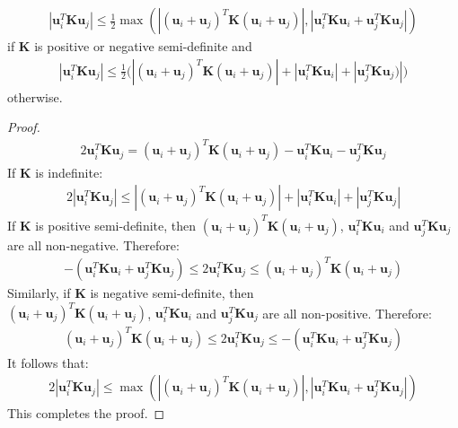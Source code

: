 \begin{lemma}
  \begin{align}
    |\bm{u}_i^T \bm{K} \bm{u}_j| \leq \frac{1}{2} \max(|(\bm{u}_i + \bm{u}_j)^T \bm{K} (\bm{u}_i + \bm{u}_j)|, |\bm{u}_i^T \bm{K} \bm{u}_i + \bm{u}_j^T \bm{K} \bm{u}_j|)
  \end{align}
  if $\bm{K}$ is positive or negative semi-definite and
  \begin{align}
    |\bm{u}_i^T \bm{K} \bm{u}_j| \leq \frac{1}{2} \Big( |(\bm{u}_i + \bm{u}_j)^T \bm{K} (\bm{u}_i + \bm{u}_j)| + |\bm{u}_i^T \bm{K} \bm{u}_i| + |\bm{u}_j^T \bm{K} \bm{u}_j)| \Big)
  \end{align}
  otherwise.
  \label{lemma:bound1}
\end{lemma}
\begin{proof}
  \begin{align}
    2 \bm{u}_i^T \bm{K} \bm{u}_j = (\bm{u}_i + \bm{u}_j)^T \bm{K} (\bm{u}_i + \bm{u}_j) - \bm{u}_i^T \bm{K} \bm{u}_i - \bm{u}_j^T \bm{K} \bm{u}_j
  \end{align}
  If $\bm{K}$ is indefinite:
  \begin{align}
    2 |\bm{u}_i^T \bm{K} \bm{u}_j| \leq |(\bm{u}_i + \bm{u}_j)^T \bm{K} (\bm{u}_i + \bm{u}_j)| + |\bm{u}_i^T \bm{K} \bm{u}_i| + |\bm{u}_j^T \bm{K} \bm{u}_j|
  \end{align}
  If $\bm{K}$ is positive semi-definite, then $(\bm{u}_i + \bm{u}_j)^T \bm{K} (\bm{u}_i + \bm{u}_j)$, $\bm{u}_i^T \bm{K} \bm{u}_i$ and $\bm{u}_j^T \bm{K} \bm{u}_j$ are all non-negative. Therefore:
  \begin{align}
    -(\bm{u}_i^T \bm{K} \bm{u}_i + \bm{u}_j^T \bm{K} \bm{u}_j) \leq 2 \bm{u}_i^T \bm{K} \bm{u}_j \leq (\bm{u}_i + \bm{u}_j)^T \bm{K} (\bm{u}_i + \bm{u}_j)
  \end{align}
  Similarly, if $\bm{K}$ is negative semi-definite, then \\ $(\bm{u}_i + \bm{u}_j)^T \bm{K} (\bm{u}_i + \bm{u}_j)$, $\bm{u}_i^T \bm{K} \bm{u}_i$ and $\bm{u}_j^T \bm{K} \bm{u}_j$ are all non-positive. Therefore:
  \begin{align}
    (\bm{u}_i + \bm{u}_j)^T \bm{K} (\bm{u}_i + \bm{u}_j) \leq 2 \bm{u}_i^T \bm{K} \bm{u}_j \leq -(\bm{u}_i^T \bm{K} \bm{u}_i + \bm{u}_j^T \bm{K} \bm{u}_j)
  \end{align}
  It follows that:
  \begin{align}
    2 |\bm{u}_i^T \bm{K} \bm{u}_j| \leq \max(|(\bm{u}_i + \bm{u}_j)^T \bm{K} (\bm{u}_i + \bm{u}_j)|, |\bm{u}_i^T \bm{K} \bm{u}_i + \bm{u}_j^T \bm{K} \bm{u}_j|)
  \end{align}
  This completes the proof.
\end{proof}
